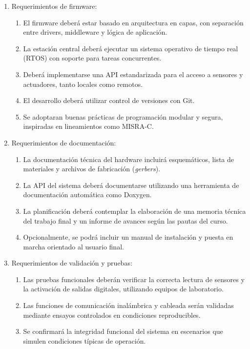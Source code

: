 \documentclass[
11pt, %
]{charter}
\begin{document}
\begin{enumerate}
	\item Requerimientos de firmware:
		\begin{enumerate}
			\item El firmware deberá estar basado en arquitectura en capas, con separación entre drivers, middleware y lógica de aplicación.
			\item La estación central deberá ejecutar un sistema operativo de tiempo real (RTOS) con soporte para tareas concurrentes.
			\item Deberá implementarse una API estandarizada para el acceso a sensores y actuadores, tanto locales como remotos.
			\item El desarrollo deberá utilizar control de versiones con Git.
			\item Se adoptaran buenas prácticas de programación modular y segura, inspiradas en lineamientos como MISRA-C.
		\end{enumerate}
		
	\item Requerimientos de documentación:
		\begin{enumerate}
			\item La documentación técnica del hardware incluirá esquemáticos, lista de materiales y archivos de fabricación (\textit{gerbers}).
			\item La API del sistema deberá documentarse utilizando una herramienta de documentación automática como Doxygen.
			\item La planificación deberá contemplar la elaboración de una memoria técnica del trabajo final y un informe de avances según las pautas del curso.
			\item Opcionalmente, se podrá incluir un manual de instalación y puesta en marcha orientado al usuario final.
		\end{enumerate}
		
	\item Requerimientos de validación y pruebas:
		\begin{enumerate}
			\item Las pruebas funcionales deberán verificar la correcta lectura de sensores y la activación de salidas digitales, utilizando equipos de laboratorio.
			\item Las funciones de comunicación inalámbrica y cableada serán validadas mediante ensayos controlados en condiciones reproducibles.
			\item Se confirmará la integridad funcional del sistema en escenarios que simulen condiciones típicas de operación.
		\end{enumerate}
		

\end{enumerate}
\end{document}
